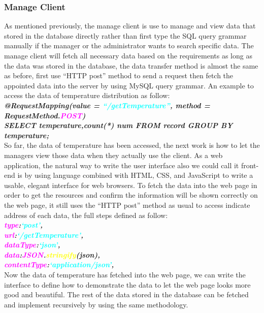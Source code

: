 \documentclass[12pt]{article}
\begin{document}
\subsubsection{Manage Client}
As mentioned previously, the manage client is use to manage and view data that stored in the database directly rather than first type the SQL query grammar manually if the manager or the administrator wants to search specific data. The manage client will fetch all necessary data based on the requirements as long as the data was stored in the database, the data transfer method is almost the same as before, first use ``HTTP post'' method to send a request then fetch the appointed data into the server by using MySQL query grammar. An example to access the data of temperature distribution as follow:
\\ \textit{\textbf{@RequestMapping(value = \textcolor{cyan}{``/getTemperature''}, method = RequestMethod.\textcolor{magenta}{POST})}}
\\ \textit{\textbf{SELECT temperature,count(*) num FROM record GROUP BY temperature;}}
\\So far, the data of temperature has been accessed, the next work is how to let the managers view those data when they actually use the client. As a web application, the natural way to write the user interface also we could call it front-end is by using language combined with HTML, CSS, and JavaScript to write a usable, elegant interface for web browsers. To fetch the data into the web page in order to get the resources and confirm the information will be shown correctly on the web page, it still uses the ``HTTP post'' method as usual to access indicate address of each data, the full steps defined as follow:
\\\textit{\textbf{\textcolor{magenta}{type}:\textcolor{cyan}{`post'},}}
\\\textit{\textbf{\textcolor{magenta}{url}:\textcolor{cyan}{`/getTemperature'},}}
\\\textit{\textbf{\textcolor{magenta}{dataType}:\textcolor{cyan}{`json'},}}
\\\textit{\textbf{\textcolor{magenta}{data}:\textcolor{magenta}{JSON}.\textcolor{yellow}{stringify}(json),}}
\\\textit{\textbf{\textcolor{magenta}{contentType}:\textcolor{cyan}{`application/json'},}}
\\Now the data of temperature has fetched into the web page, we can write the interface to define how to demonstrate the data to let the web page looks more good and beautiful. The rest of the data stored in the database can be fetched and implement recursively by using the same methodology.
\end{document}
